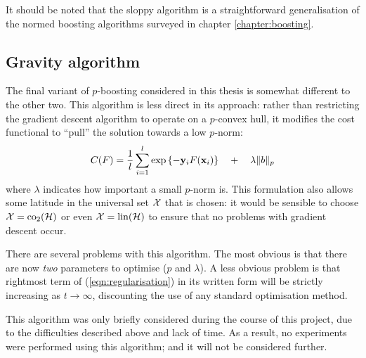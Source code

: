 It should be noted that the sloppy algorithm is a straightforward
generalisation of the normed boosting algorithms surveyed in chapter
\ref{chapter:boosting}.


\subsection{Gravity algorithm}

The final variant of $p$-boosting considered in this thesis is
somewhat different to the other two.  This algorithm is less direct in
its approach: rather than restricting the gradient descent algorithm
to operate on a $p$-convex hull, it modifies the cost functional to
``pull'' the solution towards a low $p$-norm:
%
\begin{equation}
C(F) = \frac{1}{l} \sum_{i=1}^{l} \exp
\left\{ -\mathbf{y}_iF(\mathbf{x}_i) \right\} \quad + \quad \lambda \|b\|_p
\label{eqn:regularisation}
\end{equation}
%
where $\lambda$ indicates how important a small $p$-norm is.  This
formulation also allows some latitude in the universal set $\mathcal{X}$
that is chosen: it would be sensible to choose $\mathcal{X} = \mathrm{co}_2(\mathcal{H})$
or even $\mathcal{X} = \mathrm{lin}(\mathcal{H})$ to ensure that no problems with gradient
descent occur.

There are several problems with this algorithm.  The most obvious is that
there are now \emph{two} parameters to optimise ($p$ and $\lambda$).
A less obvious problem is that rightmost term of
(\ref{eqn:regularisation}) in its written form will be strictly
increasing as $t \rightarrow \infty$, discounting the use of any
standard optimisation method.

This algorithm was only briefly considered during the course of this
project, due to the difficulties described above and lack of time.  As
a result, no experiments were performed using this algorithm; and it
will not be considered further.





